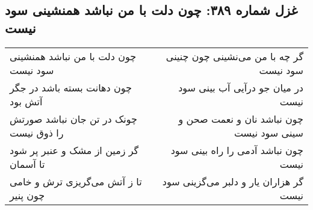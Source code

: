 \begin{center}
\section*{غزل شماره ۳۸۹: چون دلت با من نباشد همنشینی سود نیست}
\label{sec:0389}
\begin{longtable}{l p{0.5cm} r}
چون دلت با من نباشد همنشینی سود نیست
&&
گر چه با من می‌نشینی چون چنینی سود نیست
\\
چون دهانت بسته باشد در جگر آتش بود
&&
در میان جو درآیی آب بینی سود نیست
\\
چونک در تن جان نباشد صورتش را ذوق نیست
&&
چون نباشد نان و نعمت صحن و سینی سود نیست
\\
گر زمین از مشک و عنبر پر شود تا آسمان
&&
چون نباشد آدمی را راه بینی سود نیست
\\
تا ز آتش می‌گریزی ترش و خامی چون پنیر
&&
گر هزاران یار و دلبر می‌گزینی سود نیست
\\
\end{longtable}
\end{center}
